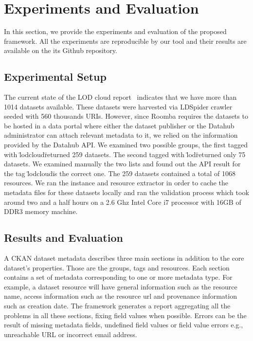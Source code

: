 \documentclass[runningheads,a4paper]{llncs}
\begin{document}

\section{Experiments and Evaluation}
\label{sec:experiment}

In this section, we provide the experiments and evaluation of the proposed framework. All the experiments are reproducible by our tool and their results are available on the its Github repository.

\subsection{Experimental Setup}

The current state of the LOD cloud report~\cite{DBLP:conf/semweb/SchmachtenbergBP14} indicates that we have more than 1014 datasets available. These datasets were harvested via LDSpider crawler~\cite{conf/semweb/IseleUBH10} seeded with 560 thousands URIs. However, since Roomba requires the datasets to be hosted in a data portal where either the dataset publisher or the Datahub administrator can attach relevant metadata to it, we relied on the information provided by the Datahub API. We examined two possible groups, the first tagged with \"lodcloud\" returned 259 datasets. The second tagged with \"lod\" returned only 75 datasets. We examined manually the two lists and found out the API result for the tag \"lodcloud\" is the correct one. The 259 datasets contained a total of 1068 resources. We ran the instance and resource extractor in order to cache the metadata files for these datasets locally and ran the validation process which took around two and a half hours on a 2.6 Ghz Intel Core i7 processor with 16GB of DDR3 memory machine.

\subsection{Results and Evaluation}

A CKAN dataset metadata describes three main sections in addition to the core dataset's properties. Those are the groups, tags and resources. Each section contains a set of metadata corresponding to one or more metadata type. For example, a dataset resource will have general information such as the resource name, access information such as the resource url and provenance information such as creation date. The framework generates a report aggregating all the problems in all these sections, fixing field values when possible. Errors can be the result of missing metadata fields, undefined field values or field value errors e.g., unreachable URL or incorrect email address.
\end{document}
